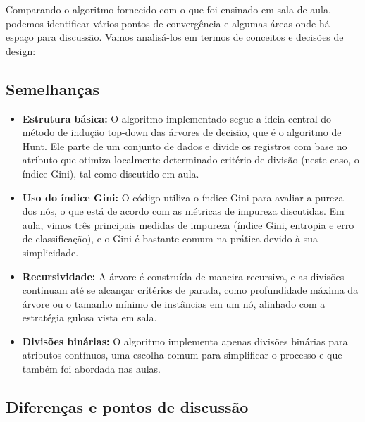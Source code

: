\documentclass[12pt]{article}
\begin{document}
Comparando o algoritmo fornecido com o que foi ensinado em sala de aula, podemos identificar vários pontos de convergência e algumas áreas onde há espaço para discussão. Vamos analisá-los em termos de conceitos e decisões de design:

\subsection*{Semelhanças}

\begin{itemize}
    \item \textbf{Estrutura básica:} O algoritmo implementado segue a ideia central do método de indução top-down das árvores de decisão, que é o algoritmo de Hunt. Ele parte de um conjunto de dados e divide os registros com base no atributo que otimiza localmente determinado critério de divisão (neste caso, o índice Gini), tal como discutido em aula.
    
    \item \textbf{Uso do índice Gini:} O código utiliza o índice Gini para avaliar a pureza dos nós, o que está de acordo com as métricas de impureza discutidas. Em aula, vimos três principais medidas de impureza (índice Gini, entropia e erro de classificação), e o Gini é bastante comum na prática devido à sua simplicidade.
    
    \item \textbf{Recursividade:} A árvore é construída de maneira recursiva, e as divisões continuam até se alcançar critérios de parada, como profundidade máxima da árvore ou o tamanho mínimo de instâncias em um nó, alinhado com a estratégia gulosa vista em sala.
    
    \item \textbf{Divisões binárias:} O algoritmo implementa apenas divisões binárias para atributos contínuos, uma escolha comum para simplificar o processo e que também foi abordada nas aulas.
\end{itemize}

\subsection*{Diferenças e pontos de discussão}
\end{document}
